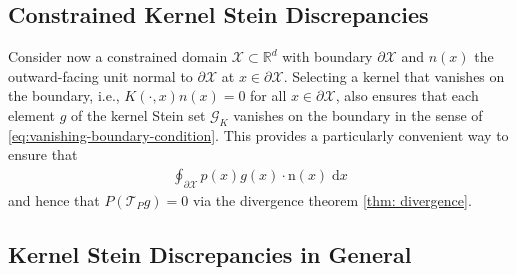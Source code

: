 \documentclass[12pt,paper=letter]{scrreprt}
\def\reals{\mathbb{R}} %
\newcommand{\xset}[0]{\mathcal{X}} %
\newcommand{\gset}[0]{\mathcal{G}} %
\begin{document}
\subsection{Constrained Kernel Stein Discrepancies}\label{subsec: constrained ksdsl}

Consider now a constrained domain  $\xset\subset \reals^d$ with boundary  $\partial\xset$ and $n(x)$ the outward-facing unit normal to $\partial\xset$ at $x \in \partial\xset$. 
Selecting a kernel that vanishes on the boundary, i.e., $K(\cdot,x) n(x) = 0$ for all $x\in\partial\xset$, also ensures that each element $g$ of the kernel Stein set $\gset_K$ vanishes on the boundary in the sense of \cref{eq:vanishing-boundary-condition}.
This provides a particularly convenient way to ensure that 
\begin{align*}
    \oint_{\partial \mathcal{X}} p(x) g(x) \cdot \mathrm{n}(x) \; \mathrm{d}x
\end{align*}
and hence that $P(\mathcal{T}_P g) = 0$ via the divergence theorem \cref{thm: divergence}.



\subsection{Kernel Stein Discrepancies in General}\label{subsec: ksds in general}
\end{document}
